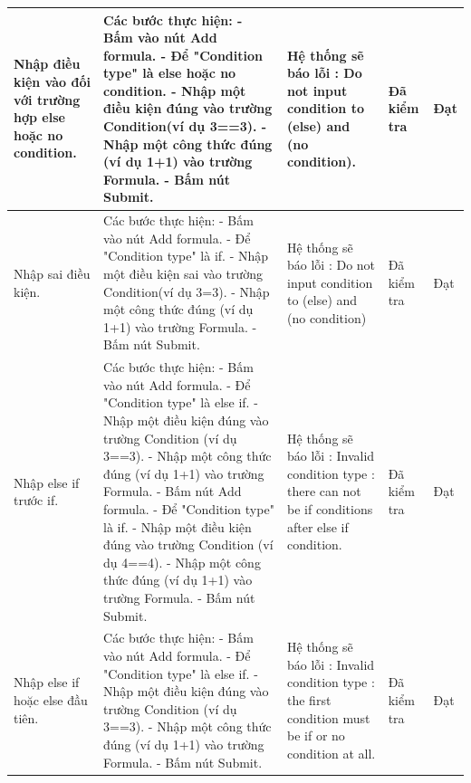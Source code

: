 \documentclass{article}
\begin{document}
\begin{longtable}{ | p{} |p{} | p{}  | p{}  | p{}  | }
\hline
Nhập điều kiện vào đối với trường hợp else hoặc no condition. &
Các bước thực hiện: \newline
- Bấm vào nút Add formula. \newline
- Để "Condition type" là else hoặc no condition. \newline
- Nhập một điều kiện đúng vào trường Condition(ví dụ 3==3). \newline
- Nhập một công thức đúng (ví dụ 1+1) vào trường Formula. \newline
- Bấm nút Submit.  
&
Hệ thống sẽ báo lỗi : Do not input condition to (else) and (no condition).
&
Đã kiểm tra &
Đạt \\

\hline
Nhập sai điều kiện. &
Các bước thực hiện: \newline
- Bấm vào nút Add formula. \newline
- Để "Condition type" là if. \newline
- Nhập một điều kiện sai vào trường Condition(ví dụ 3=3). \newline
- Nhập một công thức đúng (ví dụ 1+1) vào trường Formula. \newline
- Bấm nút Submit.  
&
Hệ thống sẽ báo lỗi : Do not input condition to (else) and (no condition)
&
Đã kiểm tra &
Đạt \\

\hline
Nhập else if trước if. &
Các bước thực hiện: \newline
- Bấm vào nút Add formula. \newline
- Để "Condition type" là else if. \newline
- Nhập một điều kiện đúng vào trường Condition (ví dụ 3==3). \newline
- Nhập một công thức đúng (ví dụ 1+1) vào trường Formula. \newline
- Bấm nút Add formula. \newline
- Để "Condition type" là if. \newline
- Nhập một điều kiện đúng vào trường Condition (ví dụ 4==4). \newline
- Nhập một công thức đúng (ví dụ 1+1) vào trường Formula. \newline
- Bấm nút Submit.  
&
Hệ thống sẽ báo lỗi : Invalid condition type : there can not be if conditions after else if condition.
&
Đã kiểm tra &
Đạt \\

\hline
Nhập else if hoặc else đầu tiên. &
Các bước thực hiện: \newline
- Bấm vào nút Add formula. \newline
- Để "Condition type" là else if. \newline
- Nhập một điều kiện đúng vào trường Condition (ví dụ 3==3). \newline
- Nhập một công thức đúng (ví dụ 1+1) vào trường Formula. \newline
- Bấm nút Submit.
&
Hệ thống sẽ báo lỗi : Invalid condition type : the first condition must be if or no condition at all.
&
Đã kiểm tra &
Đạt \\


\end{longtable}
\end{document}

